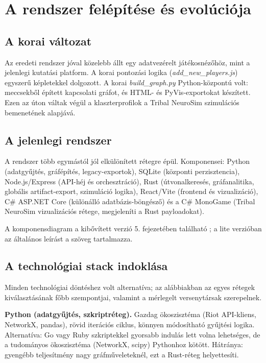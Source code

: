 \chapter{A rendszer felépítése és evolúciója}

\section{A korai változat}

Az eredeti rendszer jóval közelebb állt egy adatvezérelt játékosnézőhöz, mint a jelenlegi kutatási platform. A korai pontozási logika (\textit{add\_new\_players.js}) egyszerű képletekkel dolgozott. A korai \textit{build\_graph.py} Python-központú volt: meccsekből épített kapcsolati gráfot, és HTML- és PyVis-exportokat készített. Ezen az úton váltak végül a klaszterprofilok a Tribal NeuroSim szimulációs bemenetének alapjává.

\section{A jelenlegi rendszer}

A rendszer több egymástól jól elkülönített rétegre épül. Komponensei: Python (adatgyűjtés, gráfépítés, legacy-exportok), SQLite (központi perzisztencia), Node.js/Express (API-héj és orchesztráció), Rust (útvonalkeresés, gráfanalitika, globális artifact-export, szimuláció logika), React/Vite (frontend és vizualizáció), C\# ASP.NET Core (különálló adatbázis-böngésző) és a C\# MonoGame (Tribal NeuroSim vizualizációs rétege, megjeleníti a Rust payloadokat).

A komponensdiagram a kibővített verzió 5. fejezetében található \cite{premadegraph-full}; a lite verzióban az általános leírást a szöveg tartalmazza.

\section{A technológiai stack indoklása}

Minden technológiai döntéshez volt alternatíva; az alábbiakban az egyes rétegek kiválasztásának főbb szempontjai, valamint a mérlegelt versenytársak szerepelnek.

\textbf{Python (adatgyűjtés, szkriptréteg).} Gazdag ökoszisztéma (Riot API-kliens, NetworkX, pandas), rövid iterációs ciklus, könnyen módosítható gyűjtési logika. Alternatíva: Go vagy Ruby szkriptekkel gyorsabb indulás lett volna lehetséges, de a tudományos ökoszisztéma (NetworkX, scipy) Pythonhoz kötött. Hátránya: gyengébb teljesítmény nagy gráfműveleteknél, ezt a Rust-réteg helyettesíti.


